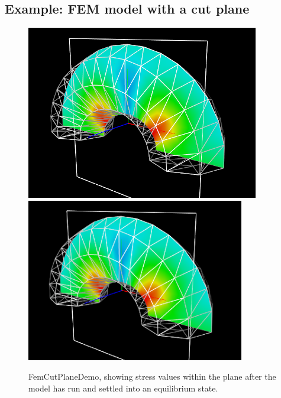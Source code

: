 \subsection{Example: FEM model with a cut plane}

\begin{figure}[ht]
\begin{center}
\iflatexml
 \includegraphics[]{images/FemCutPlaneDemo}
\else
 \includegraphics[width=3.75in]{images/FemCutPlaneDemo}
\fi
\end{center}
\caption{FemCutPlaneDemo, showing stress values within the plane 
after the model has run and settled into an equilibrium state.}
\label{FemCutPlaneDemo:fig}
\end{figure}

